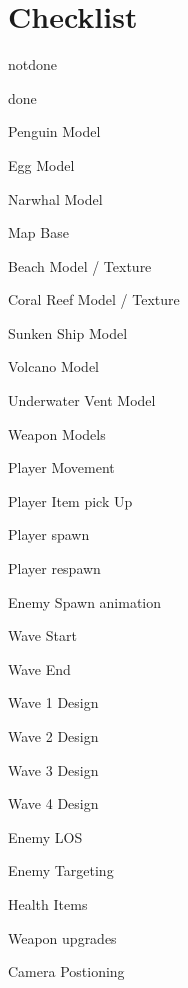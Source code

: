 \documentclass{article}
\newcommand{\cmark}{\ding{51}}%
\newcommand{\done}{\rlap{$\square$}{\raisebox{1pt}{\large\hspace{1pt}\cmark}}%
\hspace{-2.5pt}}
\begin{document}
\section{Checklist}
\begin{todolist}
\item notdone
\item[\done] done
\item Penguin Model
\item Egg Model
\item Narwhal Model
\item Map Base
\item Beach Model / Texture
\item Coral Reef Model / Texture
\item Sunken Ship Model
\item Volcano Model
\item Underwater Vent Model
\item Weapon Models
\item Player Movement
\item Player Item pick Up
\item Player spawn
\item Player respawn
\item Enemy Spawn animation
\item Wave Start
\item Wave End
\item Wave 1 Design
\item Wave 2 Design
\item Wave 3 Design
\item Wave 4 Design
\item Enemy LOS
\item Enemy Targeting
\item Health Items
\item Weapon upgrades
\item Camera Postioning


\end{todolist}
\end{document}
